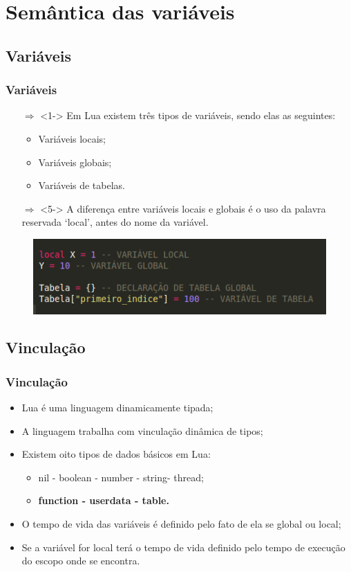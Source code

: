 \documentclass{beamer}
\begin{document}
\section{Semântica das variáveis}
\subsection{Variáveis}
\begin{frame}[fragile]
\frametitle{Variáveis}
	\begin{itemize}
	\item [$\Rightarrow$]<1-> Em Lua existem três tipos de variáveis, sendo elas as seguintes:
	\begin{itemize}
		\item <2-> Variáveis locais;
		\item <3-> Variáveis globais;
		\item <4-> Variáveis de tabelas.
	\end{itemize}
	\item [$\Rightarrow$]<5-> A diferença entre variáveis locais e globais é o uso da palavra reservada ‘local’, antes do nome da variável.
	\end{itemize}
	\begin{figure}[!htb]
		\centering
		\includegraphics[width=0.7\linewidth]{imagens/variaveis}
	\end{figure}
\end{frame}

\subsection{Vinculação}
\begin{frame}[fragile]
\frametitle{Vinculação}
	\begin{itemize}
	\item<1-> Lua é uma linguagem dinamicamente tipada; 
	\item<2-> A linguagem trabalha com vinculação dinâmica de tipos;
	\item<3-> Existem oito tipos de dados básicos em Lua:
	\begin{itemize}
		\item<4-> nil - boolean - number - string- thread;
		\item<5-> \textbf{function - userdata - table.}
	\end{itemize}
	\item<6-> O tempo de vida das variáveis é definido pelo fato de ela se global ou local;
	\item<7-> Se a variável for local terá o tempo de vida definido pelo tempo de execução do escopo onde se encontra.
	\end{itemize}
\end{frame}
\end{document}
